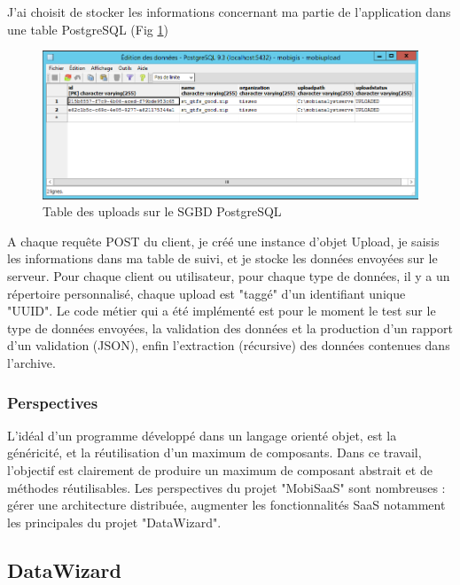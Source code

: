 \begin{itemize}
J'ai choisit de stocker les informations concernant ma partie de l'application dans une table PostgreSQL (Fig \ref{TablePostgres})\\
\begin{figure}[!h]
\centering
\includegraphics[width=14cm]{images/tablePostgres_mobiupload_small.png}
\caption{\label{TablePostgres}Table des uploads sur le SGBD PostgreSQL}
\end{figure} 

A chaque requête POST du client, je créé une instance d'objet Upload, je saisis les informations dans ma table de suivi, et je stocke les données envoyées sur le serveur. Pour chaque client ou utilisateur, pour chaque type de données, il y a un répertoire personnalisé, chaque upload est "taggé" d'un identifiant unique "UUID".
Le code métier qui a été implémenté est pour le moment le test sur le type de données envoyées, la validation des données et la production d'un rapport d'un validation (JSON), enfin l'extraction (récursive) des données contenues dans l'archive.\\

\subsubsection{Perspectives}

L'idéal d'un programme développé dans un langage orienté objet, est la généricité, et la réutilisation d'un maximum de composants. Dans ce travail, l'objectif est clairement de produire un maximum de composant abstrait et de méthodes réutilisables. Les perspectives du projet "MobiSaaS" sont nombreuses : gérer une architecture distribuée, augmenter les fonctionnalités SaaS notamment les principales du projet "DataWizard".\\

\subsection{DataWizard}


\end{itemize}
